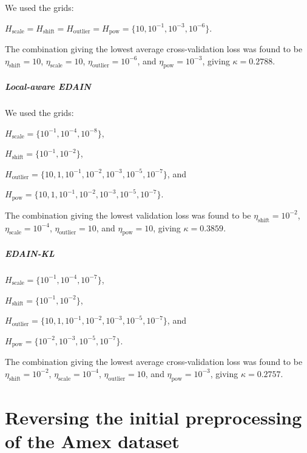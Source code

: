 \documentclass{statsmsc}
\begin{document}
{We used the grids:

$H_{\textrm{scale}}=H_{\textrm{shift}}=H_{\textrm{outlier}}=H_{\textrm{pow}}=\{
10, 10^{-1}, 10^{-3}, 10^{-6}\}$.

The combination giving the lowest average cross-validation loss was found to be
$\eta_{\textrm{shift}}=10$,
$\eta_{\textrm{scale}}=10$,
$\eta_{\textrm{outlier}}=10^{-6}$, and
$\eta_{\textrm{pow}}=10^{-3}$, giving $\kappa=0.2788$.

\paragraph{Local-aware EDAIN}%

We used the grids:

$H_{\textrm{scale}}=\{10^{-1}, 10^{-4}, 10^{-8}\}$,

$H_{\textrm{shift}}=\{10^{-1}, 10^{-2}\}$,

$H_{\textrm{outlier}}=\{10, 1, 10^{-1}, 10^{-2}, 10^{-3}, 10^{-5}, 10^{-7}\}$, and

$H_{\textrm{pow}}=\{10, 1, 10^{-1}, 10^{-2}, 10^{-3}, 10^{-5}, 10^{-7}\}$.

The combination giving the lowest validation loss was found to be
$\eta_{\textrm{shift}}=10^{-2}$,
$\eta_{\textrm{scale}}=10^{-4}$,
$\eta_{\textrm{outlier}}=10$, and
$\eta_{\textrm{pow}}=10$, giving $\kappa=0.3859$.

\paragraph{EDAIN-KL}%


$H_{\textrm{scale}}=\{10^{-1}, 10^{-4}, 10^{-7}\}$,

$H_{\textrm{shift}}=\{10^{-1}, 10^{-2}\}$,

$H_{\textrm{outlier}}=\{10, 1, 10^{-1}, 10^{-2}, 10^{-3}, 10^{-5}, 10^{-7}\}$, and

$H_{\textrm{pow}}=\{10^{-2}, 10^{-3}, 10^{-5}, 10^{-7}\}$.

The combination giving the lowest average cross-validation loss was found to be
$\eta_{\textrm{shift}}=10^{-2}$,
$\eta_{\textrm{scale}}=10^{-4}$,
$\eta_{\textrm{outlier}}=10$, and
$\eta_{\textrm{pow}}=10^{-3}$, giving $\kappa=0.2757$.


\chapter{Reversing the initial preprocessing of the Amex dataset}%
\label{ch:undo_amex_pre}

}
\end{document}
